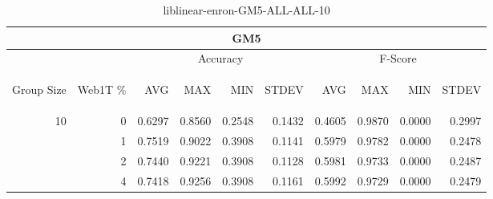 \begin{center}
\begin{table}[htbp] 
 \begin{center}
\begin{tabular}{ | r | r | r | r | r | r | r | r | r | r |}
\hline
\multicolumn{10}{|c|}{GM5}\\
\hline
 & & \multicolumn{4}{|c|}{Accuracy} & \multicolumn{4}{|c|}{F-Score}\\ \cline{3-10}
\begin{sideways}Group Size\end{sideways} & \begin{sideways}Web1T \%\end{sideways} & \begin{sideways}AVG\end{sideways} & \begin{sideways}MAX\end{sideways} & \begin{sideways}MIN\end{sideways} & \begin{sideways}STDEV\end{sideways} & \begin{sideways}AVG\end{sideways} & \begin{sideways}MAX\end{sideways} & \begin{sideways}MIN\end{sideways} & \begin{sideways}STDEV\end{sideways}\\
\hline
\multirow{3}{*}{10}
 & 0 & 0.6297 & 0.8560 & 0.2548 & 0.1432 & 0.4605 & 0.9870 & 0.0000 & 0.2997\\ \cline{2-10}
 & 1 & 0.7519 & 0.9022 & 0.3908 & 0.1141 & 0.5979 & 0.9782 & 0.0000 & 0.2478\\ \cline{2-10}
 & 2 & 0.7440 & 0.9221 & 0.3908 & 0.1128 & 0.5981 & 0.9733 & 0.0000 & 0.2487\\ \cline{2-10}
 & 4 & 0.7418 & 0.9256 & 0.3908 & 0.1161 & 0.5992 & 0.9729 & 0.0000 & 0.2479\\ \cline{2-10}
\hline
\end{tabular}
\caption{liblinear-enron-GM5-ALL-ALL-10}
\label{table:liblinear-enron-GM5-ALL-ALL-10}
\end{center}
 \end{table}
\end{center}

